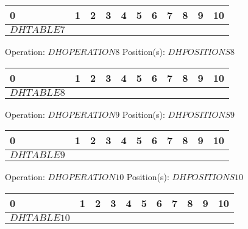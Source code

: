 {{\begin{center}
\begin{tabular}{|P{0.75cm}|P{0.75cm}|P{0.75cm}|P{0.75cm}|P{0.75cm}|P{0.75cm}|P{0.75cm}|P{0.75cm}|P{0.75cm}|P{0.75cm}|P{0.75cm}|}
                0 & 1 & 2 & 3 & 4 & 5 & 6 & 7 & 8 & 9 & 10  \\
                \hline
                $DHTABLE7$ \\
                \hline
            \end{tabular}
        \end{center}Operation: \underline{\color{tumgadRed}$DHOPERATION8$} \hspace{10px} Position(s): \underline{\color{tumgadRed}$DHPOSITIONS8$}
        \begin{center}
            \begin{tabular}{|P{0.75cm}|P{0.75cm}|P{0.75cm}|P{0.75cm}|P{0.75cm}|P{0.75cm}|P{0.75cm}|P{0.75cm}|P{0.75cm}|P{0.75cm}|P{0.75cm}|}
                 & 1 & 2 & 3 & 4 & 5 & 6 & 7 & 8 & 9 & 10  \\
                \hline
                $DHTABLE8$ \\
                \hline
            \end{tabular}
        \end{center}Operation: \underline{\color{tumgadRed}$DHOPERATION9$} \hspace{10px} Position(s): \underline{\color{tumgadRed}$DHPOSITIONS9$}
        \begin{center}
            \begin{tabular}{|P{0.75cm}|P{0.75cm}|P{0.75cm}|P{0.75cm}|P{0.75cm}|P{0.75cm}|P{0.75cm}|P{0.75cm}|P{0.75cm}|P{0.75cm}|P{0.75cm}|}
                 & 1 & 2 & 3 & 4 & 5 & 6 & 7 & 8 & 9 & 10  \\
                \hline
                $DHTABLE9$ \\
                \hline
            \end{tabular}
        \end{center}Operation: \underline{\color{tumgadRed}$DHOPERATION10$} \hspace{10px} Position(s): \underline{\color{tumgadRed}$DHPOSITIONS10$}
        \begin{center}
            \begin{tabular}{|P{0.75cm}|P{0.75cm}|P{0.75cm}|P{0.75cm}|P{0.75cm}|P{0.75cm}|P{0.75cm}|P{0.75cm}|P{0.75cm}|P{0.75cm}|P{0.75cm}|}
                 & 1 & 2 & 3 & 4 & 5 & 6 & 7 & 8 & 9 & 10  \\
                \hline
                $DHTABLE10$ \\
                \hline
            \end{tabular}
        \end{center}
    }
}
